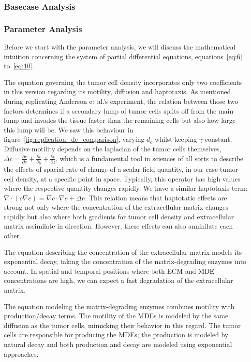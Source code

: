 \subsubsection{Basecase Analysis}
\label{sec:replication_2D_without_proliferation}


\subsubsection{Parameter Analysis}
Before we start with the parameter analysis, we will discuss the mathematical intuition concerning the system of partial differential equations, equations~\ref{eq:6} to~\ref{eq:10}. 

The equation governing the tumor cell density incorporates only two coefficients in this version regarding its motility, diffusion and haptotaxis. As mentioned during replicating Anderson et al.'s experiment, the relation between those two factors determines if a secondary lump of tumor cells splits off from the main lump and invades the tissue faster than the remaining cells but also how large this lump will be. We saw this behaviour in figure~\ref{fig:replication_dc_comparison}, varying $d_c$ whilst keeping $\gamma$ constant. Diffusive motility depends on the laplacian of the tumor cells themselves, $\Delta c = \frac{\partial c}{\partial x} + \frac{\partial c}{\partial y} + \frac{\partial c}{\partial z}$, which is a fundamental tool in sciences of all sorts to describe the effects of spacial rate of change of a scalar field quantity, in our case tumor cell density, at a specific point in space. Typically, this operator has high values where the respective quantity changes rapidly. We have a similar haptotaxis term: $\nabla \cdot (c\nabla e) = \nabla c \cdot \nabla e + \Delta e$. This relation means that haptotatic effects are strong not only where the concentration of the extracellular matrix changes rapidly but also where both gradients for tumor cell density and extracellular matrix assimilate in direction. However, these effects can also annihilate each other.

The equation describing the concentration of the extracellular matrix models its exponential decay, taking the concentration of the matrix-degrading enzymes into account. In spatial and temporal positions where both ECM and MDE concentrations are high, we can expect a fast degradation of the extracellular matrix.

The equation modeling the matrix-degrading enzymes combines motility with production/decay terms. The motility of the MDEs is modeled by the same diffusion as the tumor cells, mimicking their behavior in this regard. The tumor cells are responsible for producing the MDEs; the production is modeled by natural decay and both production and decay are modeled using exponential approaches.


